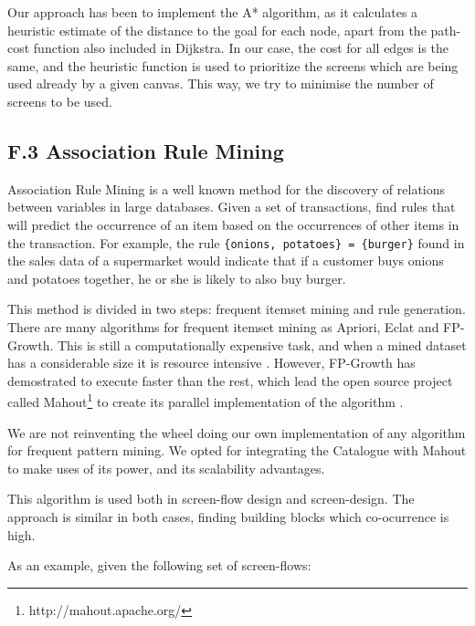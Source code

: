 \documentclass{fast_latex}
\begin{document}
Our approach has been to implement the A* algorithm, as it calculates a heuristic estimate of the distance to the goal for each node, apart from the path-cost function also included in Dijkstra. In our case, the cost for all edges is the same, and the heuristic function is used to prioritize the screens which are being used already by a given canvas. This way, we try to minimise the number of screens to be used.


\subsection*{F.3 Association Rule Mining}

Association Rule Mining is a well known method for the discovery of relations between variables in large databases. Given a set of transactions, find rules that will predict the occurrence of an item based on the occurrences of other items in the transaction. For example, the rule \verb|{onions, potatoes} = {burger}| found in the sales data of a supermarket would indicate that if a customer buys onions and potatoes together, he or she is likely to also buy burger. 

This method is divided in two steps: frequent itemset mining and rule generation. There are many algorithms for frequent itemset mining as Apriori, Eclat and FP-Growth. This is still a computationally expensive task, and when a mined dataset has a considerable size it is resource intensive \cite{Han:2000:MFP:335191.335372}. However, FP-Growth has demostrated to execute faster than the rest, which lead the open source project called Mahout\footnote{http://mahout.apache.org/} to create its parallel implementation of the algorithm \cite{Li:2008:PPF:1454008.1454027}.

We are not reinventing the wheel doing our own implementation of any algorithm for frequent pattern mining. We opted for integrating the Catalogue with Mahout to make uses of its power, and its scalability advantages.

This algorithm is used both in screen-flow design and screen-design. The approach is similar in both cases, finding building blocks which co-ocurrence is high.

As an example, given the following set of screen-flows:
\end{document}
